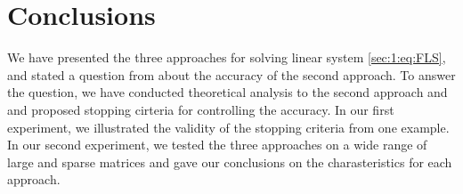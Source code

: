 \section{Conclusions}\label{sec:con}
We have presented the three approaches for solving linear system \eqref{sec:1:eq:FLS}, and stated a question from \cite[p.1]{DU24} about the accuracy of the second approach. To answer the question, we have conducted theoretical analysis to the second approach and and proposed stopping cirteria for controlling the accuracy.
In our first experiment, we illustrated the validity of the stopping criteria from one example. In our second experiment, we tested the three approaches on a wide range of large and sparse matrices and gave our conclusions on the charasteristics for each approach.

